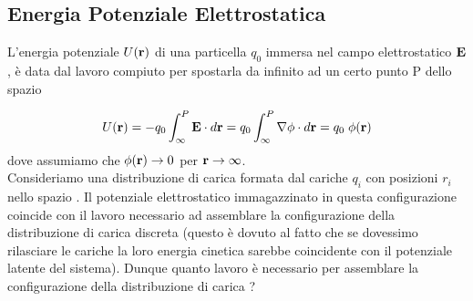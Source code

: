 \subsection{Energia Potenziale Elettrostatica}

 L'energia potenziale $U(\bold{r})$ di una particella $q_0$ immersa nel campo elettrostatico $\bold{E}$, \`e data dal lavoro compiuto per spostarla da infinito ad un certo punto P dello spazio

\begin{equation*}
	U(\bold{r}) = -	q_0\int_{\infty}^{P} \bold{E} \cdot d\bold{r} = q_0 \int_{\infty}^{P} \nabla \phi \cdot d\bold{r} = q_0 \; \phi(\bold{r})  
\end{equation*}
dove assumiamo che $\phi(\bold{r}) \to 0$ per $\bold{r} \to \infty$.
\\

Consideriamo una distribuzione di carica formata dal cariche $q_i$ con posizioni $r_i$ nello spazio . Il potenziale elettrostatico immagazzinato in questa configurazione coincide con il lavoro necessario ad assemblare la configurazione della distribuzione di carica discreta (questo \`e dovuto al fatto che se dovessimo rilasciare le cariche la loro energia cinetica sarebbe coincidente con il potenziale latente del sistema). Dunque quanto lavoro \`e necessario per assemblare la configurazione della distribuzione di carica ?
\\

